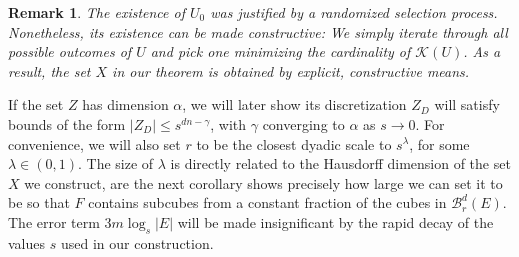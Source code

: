 \documentclass[dvipsnames]{article}
\theoremstyle{plain}
\theoremstyle{plain}
\newtheorem*{remark}{Remark}
\begin{document}
\begin{remark}
	The existence of $U_0$ was justified by a randomized selection process. Nonetheless, its existence can be made constructive: We simply iterate through all possible outcomes of $U$ and pick one minimizing the cardinality of $\mathcal{K}(U)$. As a result, the set $X$ in our theorem is obtained by explicit, constructive means.
\end{remark}

If the set $Z$ has dimension $\alpha$, we will later show its discretization $Z_D$ will satisfy bounds of the form $|Z_D| \leq s^{dn-\gamma}$, with $\gamma$ converging to $\alpha$ as $s \to 0$. For convenience, we will also set $r$ to be the closest dyadic scale to $s^\lambda$, for some $\lambda \in (0,1)$. The size of $\lambda$ is directly related to the Hausdorff dimension of the set $X$ we construct, are the next corollary shows precisely how large we can set it to be so that $F$ contains subcubes from a constant fraction of the cubes in $\mathcal{B}^d_r(E)$. The error term $3m \log_s |E|$ will be made insignificant by the rapid decay of the values $s$ used in our construction.
\end{document}
